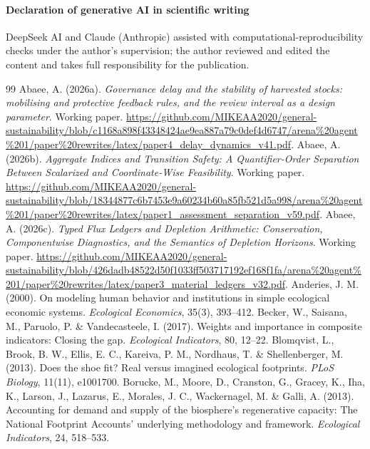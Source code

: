 \documentclass[preprint,12pt,authoryear]{elsarticle}
\begin{document}
\paragraph{Declaration of generative AI in scientific writing} DeepSeek AI and Claude (Anthropic) assisted with computational-reproducibility checks under the author's supervision; the author reviewed and edited the content and takes full responsibility for the publication.
\begin{thebibliography}{99}
 Abaee, A. (2026a). \emph{Governance delay and the stability of harvested stocks: mobilising and protective feedback rules, and the review interval as a design parameter}. Working paper. \url{https://github.com/MIKEAA2020/general-sustainability/blob/c1168a898f43348424ae9ea887a79c0def4d6747/arena%20agent%201/paper%20rewrites/latex/paper4_delay_dynamics_v41.pdf}.
 Abaee, A. (2026b). \emph{Aggregate Indices and Transition Safety: A Quantifier-Order Separation Between Scalarized and Coordinate-Wise Feasibility}. Working paper. \url{https://github.com/MIKEAA2020/general-sustainability/blob/18344877c6b7453e9a60234b60a85fb521d5a998/arena%20agent%201/paper%20rewrites/latex/paper1_assessment_separation_v59.pdf}.
 Abaee, A. (2026c). \emph{Typed Flux Ledgers and Depletion Arithmetic: Conservation, Componentwise Diagnostics, and the Semantics of Depletion Horizons}. Working paper. \url{https://github.com/MIKEAA2020/general-sustainability/blob/426dadb48522d50f1033ff503717192ef168f1fa/arena%20agent%201/paper%20rewrites/latex/paper3_material_ledgers_v32.pdf}.
 Anderies, J. M. (2000). On modeling human behavior and institutions in simple ecological economic systems. \emph{Ecological Economics}, 35(3), 393--412.
 Becker, W., Saisana, M., Paruolo, P. \& Vandecasteele, I. (2017). Weights and importance in composite indicators: Closing the gap. \emph{Ecological Indicators}, 80, 12--22.
 Blomqvist, L., Brook, B. W., Ellis, E. C., Kareiva, P. M., Nordhaus, T. \& Shellenberger, M. (2013). Does the shoe fit? Real versus imagined ecological footprints. \emph{PLoS Biology}, 11(11), e1001700.
 Borucke, M., Moore, D., Cranston, G., Gracey, K., Iha, K., Larson, J., Lazarus, E., Morales, J. C., Wackernagel, M. \& Galli, A. (2013). Accounting for demand and supply of the biosphere's regenerative capacity: The National Footprint Accounts' underlying methodology and framework. \emph{Ecological Indicators}, 24, 518--533.

\end{thebibliography}
\end{document}
